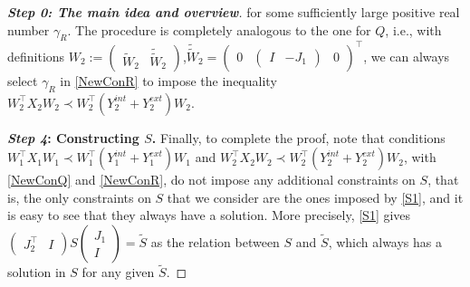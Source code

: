 \documentclass[11pt,a4paper,oneside,DIV=12,headings=small]{scrartcl}
\theoremstyle{plain}
\begin{document}
\begin{proof}[\textbf{Step 0: \textit{The main idea and overview}}]
for some sufficiently large positive real number $\gamma_R$.
The procedure is completely analogous to the one for $Q$, i.e., with definitions $W_2:=\left(\begin{smallmatrix} \tilde{W}_2 & \tilde{\tilde{W}}_2 \end{smallmatrix}\right)$,$\tilde{\tilde{W}}_2=\left(\begin{smallmatrix} 0 & \left(\begin{smallmatrix} I & -J_1 \end{smallmatrix}\right) & 0 \end{smallmatrix}\right)^\top$, we can always select $\gamma_R$ in \eqref{NewConR} to impose the inequality $W_2^\top X_2 W_2 \prec W_2^\top (Y_2^{int}+Y_2^{ext}) W_2$. 

\medskip

\textbf{\emph{Step 4}: Constructing $S$.} \newline
Finally, to complete the proof, note that conditions $W_1^\top X_1 W_1 \prec W_1^\top (Y_1^{int}+Y_1^{ext}) W_1$ and $W_2^\top X_2 W_2 \prec W_2^\top (Y_2^{int}+Y_2^{ext}) W_2$, with \eqref{NewConQ} and \eqref{NewConR}, do not impose any additional constraints on $S$, that is, the only constraints on $S$ that we consider are the ones imposed by \eqref{S1}, and it is easy to see that they always have a solution. More precisely, \eqref{S1} gives $\left(\begin{smallmatrix} J_2^\top & I \end{smallmatrix}\right)
S
\left(\begin{smallmatrix} J_1 \\ I \end{smallmatrix}\right) = \tilde{S} $ as the relation between $S$ and $\tilde{S}$, which always has a solution in $S$ for any given $\tilde{S}$.
\end{proof}
\end{document}
